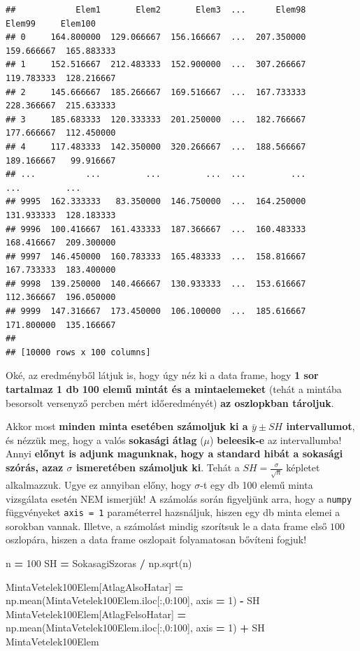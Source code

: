 \documentclass[
]{book}
\newenvironment{Shaded}{\begin{snugshade}}{\end{snugshade}}
\newcommand{\DecValTok}[1]{\textcolor[rgb]{0.00,0.00,0.81}{#1}}
\newcommand{\NormalTok}[1]{#1}
\newcommand{\OperatorTok}[1]{\textcolor[rgb]{0.81,0.36,0.00}{\textbf{#1}}}
\newcommand{\StringTok}[1]{\textcolor[rgb]{0.31,0.60,0.02}{#1}}
\begin{document}
\begin{verbatim}
##            Elem1       Elem2       Elem3  ...      Elem98      Elem99     Elem100
## 0     164.800000  129.066667  156.166667  ...  207.350000  159.666667  165.883333
## 1     152.516667  212.483333  152.900000  ...  307.266667  119.783333  128.216667
## 2     145.666667  185.266667  169.516667  ...  167.733333  228.366667  215.633333
## 3     185.683333  120.333333  201.250000  ...  182.766667  177.666667  112.450000
## 4     117.483333  142.350000  320.266667  ...  188.566667  189.166667   99.916667
## ...          ...         ...         ...  ...         ...         ...         ...
## 9995  162.333333   83.350000  146.750000  ...  164.250000  131.933333  128.183333
## 9996  100.416667  161.433333  187.366667  ...  160.483333  168.416667  209.300000
## 9997  146.450000  160.783333  165.483333  ...  158.816667  167.733333  183.400000
## 9998  139.250000  140.466667  130.933333  ...  153.616667  112.366667  196.050000
## 9999  147.316667  173.450000  106.100000  ...  185.616667  171.800000  135.166667
## 
## [10000 rows x 100 columns]
\end{verbatim}

Oké, az eredményből látjuk is, hogy úgy néz ki a data frame, hogy \textbf{1 sor tartalmaz 1 db 100 elemű mintát és a mintaelemeket} (tehát a mintába besorsolt versenyző percben mért időeredményét) \textbf{az oszlopkban tároljuk}.

Akkor most \textbf{minden minta esetében számoljuk ki a \(\bar{y} \pm SH\) intervallumot}, és nézzük meg, hogy a valós \textbf{sokasági átlag} (\(\mu\)) \textbf{beleesik-e} az intervallumba! Annyi \textbf{előnyt is adjunk magunknak, hogy a standard hibát a sokasági szórás, azaz \(\sigma\) ismeretében számoljuk ki}. Tehát a \(SH = \frac{\sigma}{\sqrt{n}}\) képletet alkalmazzuk. Ugye ez annyiban előny, hogy \(\sigma\)-t egy db 100 elemű minta vizsgálata esetén NEM ismerjük!
A számolás során figyeljünk arra, hogy a \texttt{numpy} függvényeket \texttt{axis\ =\ 1} paraméterrel hazsnáljuk, hiszen egy db minta elemei a sorokban vannak. Illetve, a számolást mindig szorítsuk le a data frame első \(100\) oszlopára, hiszen a data frame oszlopait folyamatosan bővíteni fogjuk!

\begin{Shaded}
\begin{Highlighting}[]
\NormalTok{n }\OperatorTok{=} \DecValTok{100}
\NormalTok{SH }\OperatorTok{=}\NormalTok{ SokasagiSzoras }\OperatorTok{/}\NormalTok{ np.sqrt(n)}

\NormalTok{MintaVetelek100Elem[}\StringTok{\textquotesingle{}AtlagAlsoHatar\textquotesingle{}}\NormalTok{] }\OperatorTok{=}\NormalTok{ np.mean(MintaVetelek100Elem.iloc[:,}\DecValTok{0}\NormalTok{:}\DecValTok{100}\NormalTok{], axis }\OperatorTok{=} \DecValTok{1}\NormalTok{) }\OperatorTok{{-}}\NormalTok{ SH}
\NormalTok{MintaVetelek100Elem[}\StringTok{\textquotesingle{}AtlagFelsoHatar\textquotesingle{}}\NormalTok{] }\OperatorTok{=}\NormalTok{ np.mean(MintaVetelek100Elem.iloc[:,}\DecValTok{0}\NormalTok{:}\DecValTok{100}\NormalTok{], axis }\OperatorTok{=} \DecValTok{1}\NormalTok{) }\OperatorTok{+}\NormalTok{ SH}
\NormalTok{MintaVetelek100Elem}
\end{Highlighting}
\end{Shaded}
\end{document}
